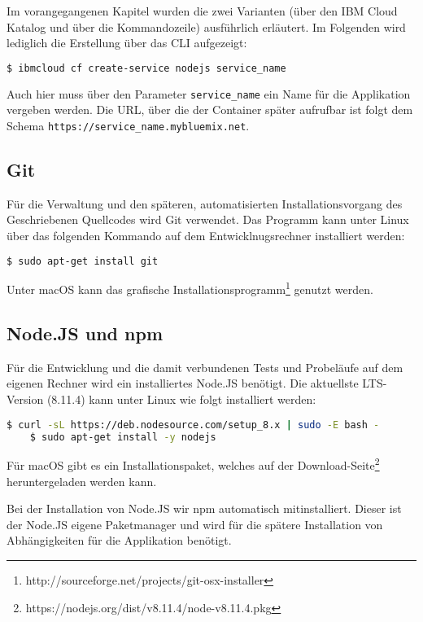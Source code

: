 Im vorangegangenen Kapitel wurden die zwei Varianten (über den IBM Cloud Katalog und über die Kommandozeile) ausführlich
erläutert. Im Folgenden wird lediglich die Erstellung über das CLI aufgezeigt:

\begin{lstlisting}[language=bash, caption=Instanziierung der Node.JS Runtime, label=Instanziierung der Node.JS Runtime]
    $ ibmcloud cf create-service nodejs service_name
\end{lstlisting}

Auch hier muss über den Parameter \texttt{service\_name} ein Name für die Applikation vergeben werden. Die URL, über die
der Container später aufrufbar ist folgt dem Schema \texttt{https://service\_name.mybluemix.net}.

\subsection{Git}
Für die Verwaltung und den späteren, automatisierten Installationsvorgang des Geschriebenen Quellcodes wird Git verwendet.
Das Programm kann unter Linux über das folgenden Kommando auf dem Entwicklnugsrechner installiert werden:

\begin{lstlisting}[language=bash, caption=Installation von Git, label=Installation von Git]
    $ sudo apt-get install git
\end{lstlisting}

Unter macOS kann das grafische Installationsprogramm\footnote{http://sourceforge.net/projects/git-osx-installer} genutzt
werden.

\subsection{Node.JS und npm}
Für die Entwicklung und die damit verbundenen Tests und Probeläufe auf dem eigenen Rechner wird ein installiertes Node.JS
benötigt. Die aktuellste LTS-Version (8.11.4) kann unter Linux wie folgt installiert werden:

\begin{lstlisting}[language=bash, caption=Installation von Node.JS, label=Installation von Node.JS]
    $ curl -sL https://deb.nodesource.com/setup_8.x | sudo -E bash -
    $ sudo apt-get install -y nodejs
\end{lstlisting}

Für macOS gibt es ein Installationspaket, welches auf der Download-Seite\footnote{https://nodejs.org/dist/v8.11.4/node-v8.11.4.pkg}
heruntergeladen werden kann.

Bei der Installation von Node.JS wir npm automatisch mitinstalliert. Dieser ist der Node.JS eigene Paketmanager und wird
für die spätere Installation von Abhängigkeiten für die Applikation benötigt.
